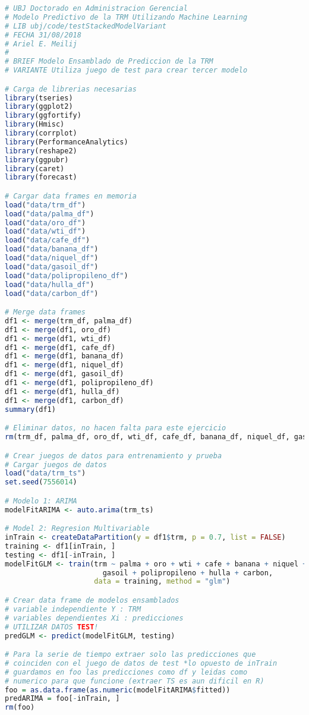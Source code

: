 \begin{lstlisting}[language=R]
# UBJ Doctorado en Administracion Gerencial
# Modelo Predictivo de la TRM Utilizando Machine Learning
# LIB ubj/code/testStackedModelVariant 
# FECHA 31/08/2018
# Ariel E. Meilij
#
# BRIEF Modelo Ensamblado de Prediccion de la TRM
# VARIANTE Utiliza juego de test para crear tercer modelo

# Carga de librerias necesarias
library(tseries)
library(ggplot2)
library(ggfortify)
library(Hmisc)
library(corrplot)
library(PerformanceAnalytics)
library(reshape2)
library(ggpubr)
library(caret)
library(forecast)

# Cargar data frames en memoria
load("data/trm_df")
load("data/palma_df")
load("data/oro_df")
load("data/wti_df")
load("data/cafe_df")
load("data/banana_df")
load("data/niquel_df")
load("data/gasoil_df")
load("data/polipropileno_df")
load("data/hulla_df")
load("data/carbon_df")

# Merge data frames
df1 <- merge(trm_df, palma_df)
df1 <- merge(df1, oro_df)
df1 <- merge(df1, wti_df)
df1 <- merge(df1, cafe_df)
df1 <- merge(df1, banana_df)
df1 <- merge(df1, niquel_df)
df1 <- merge(df1, gasoil_df)
df1 <- merge(df1, polipropileno_df)
df1 <- merge(df1, hulla_df)
df1 <- merge(df1, carbon_df)
summary(df1)

# Eliminar datos, no hacen falta para este ejercicio
rm(trm_df, palma_df, oro_df, wti_df, cafe_df, banana_df, niquel_df, gasoil_df, polipropileno_df, hulla_df, carbon_df)

# Crear juegos de datos para entrenamiento y prueba
# Cargar juegos de datos
load("data/trm_ts")
set.seed(7556014)

# Modelo 1: ARIMA
modelFitARIMA <- auto.arima(trm_ts)

# Model 2: Regresion Multivariable
inTrain <- createDataPartition(y = df1$trm, p = 0.7, list = FALSE)
training <- df1[inTrain, ]
testing <- df1[-inTrain, ]
modelFitGLM <- train(trm ~ palma + oro + wti + cafe + banana + niquel +
                       gasoil + polipropileno + hulla + carbon, 
                     data = training, method = "glm")

# Crear data frame de modelos ensamblados
# variable independiente Y : TRM
# variables dependientes Xi : predicciones
# UTILIZAR DATOS TEST!
predGLM <- predict(modelFitGLM, testing)

# Para la serie de tiempo extraer solo las predicciones que 
# coinciden con el juego de datos de test *lo opuesto de inTrain
# guardamos en foo las predicciones como df y leidas como 
# numerico para que funcione (extraer TS es aun dificil en R)
foo = as.data.frame(as.numeric(modelFitARIMA$fitted))
predARIMA = foo[-inTrain, ]
rm(foo)


\end{lstlisting}
